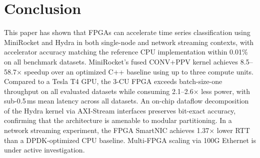 \section{Conclusion}
\label{sec:conclusion}

This paper has shown that FPGAs can accelerate time series classification using MiniRocket and Hydra in both single-node and network streaming contexts, with accelerator accuracy matching the reference CPU implementation within 0.01\% on all benchmark datasets. MiniRocket's fused CONV+PPV kernel achieves 8.5--58.7$\times$ speedup over an optimized C++ baseline using up to three compute units. Compared to a Tesla T4 GPU, the 3-CU FPGA exceeds batch-size-one throughput on all evaluated datasets while consuming 2.1--2.6$\times$ less power, with sub-0.5\,ms mean latency across all datasets. An on-chip dataflow decomposition of the Hydra kernel via AXI-Stream interfaces preserves bit-exact accuracy, confirming that the architecture is amenable to modular partitioning. In a network streaming experiment, the FPGA SmartNIC achieves 1.37$\times$ lower RTT than a DPDK-optimized CPU baseline. Multi-FPGA scaling via 100G Ethernet is under active investigation.
